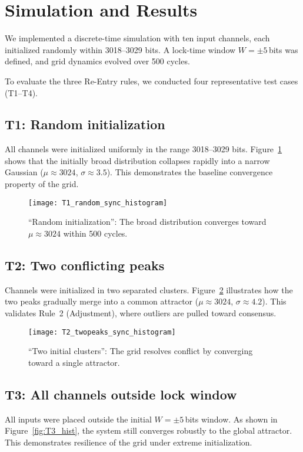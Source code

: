 \documentclass[11pt]{article}
\begin{document}
\section{Simulation and Results}
We implemented a discrete-time simulation with ten input channels, each initialized randomly within \mbox{3018--3029} bits. A lock-time window $W=\pm 5$\,bits was defined, and grid dynamics evolved over 500 cycles. 

To evaluate the three Re-Entry rules, we conducted four representative test cases (T1–T4). 

\subsection*{T1: Random initialization}
All channels were initialized uniformly in the range 3018--3029 bits.  
Figure~\ref{fig:T1_hist} shows that the initially broad distribution collapses rapidly into a narrow Gaussian ($\mu \approx 3024$, $\sigma \approx 3.5$). This demonstrates the baseline convergence property of the grid.

\begin{figure}[htbp!]
  \centering
  \texttt{[image: T1\_random\_sync\_histogram]}
  \caption{\enquote{Random initialization}: The broad distribution converges toward $\mu \approx 3024$ within 500 cycles.}
  \label{fig:T1_hist}
\end{figure}

\subsection*{T2: Two conflicting peaks}
Channels were initialized in two separated clusters.  
Figure~\ref{fig:T2_hist} illustrates how the two peaks gradually merge into a common attractor ($\mu \approx 3024$, $\sigma \approx 4.2$). This validates Rule~2 (Adjustment), where outliers are pulled toward consensus.

\begin{figure}[htbp!]
  \centering
  \texttt{[image: T2\_twopeaks\_sync\_histogram]}
  \caption{\enquote{Two initial clusters}: The grid resolves conflict by converging toward a single attractor.}
  \label{fig:T2_hist}
\end{figure}

\subsection*{T3: All channels outside lock window}
All inputs were placed outside the initial $W=\pm5$\,bits window.  
As shown in Figure~\ref{fig:T3_hist}, the system still converges robustly to the global attractor. This demonstrates resilience of the grid under extreme initialization.
\end{document}
